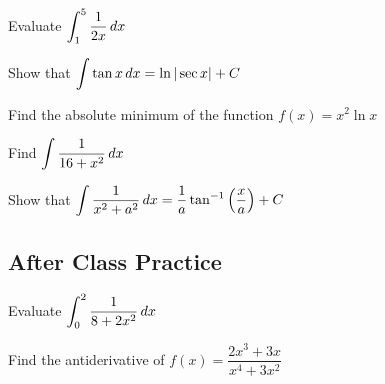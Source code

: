 \documentclass[notes]{subfiles}
\begin{document}
		\begin{ex}
			Evaluate \(\displaystyle \int_1^5 \dfrac{1}{2x}\, dx\)
		\end{ex}
			
		\begin{ex}
			Show that \(\displaystyle \int \tan x\, dx = \ln |\sec x| + C\)
		\end{ex}
			\newpage
		
		\begin{ex}
			Find the absolute minimum of the function \(f(x) = x^2\ln x\)
		\end{ex}
			
		\begin{ex}
			Find \(\displaystyle \int \dfrac{1}{16 + x^2}\, dx\)
		\end{ex}
			
		\begin{ex}
			Show that \(\displaystyle \int \dfrac{1}{x^2 + a^2}\, dx = \dfrac{1}{a}\tan^{-1}\left( \dfrac{x}{a}\right) + C\)
		\end{ex}
			\newpage
			
	\subsection*{After Class Practice}
		\begin{ex}
			Evaluate \(\displaystyle \int_0^2 \dfrac{1}{8+2x^2}\, dx\)
		\end{ex}
	
		\begin{ex}
			Find the antiderivative of \(f(x) = \dfrac{2x^3 + 3x}{x^4+3x^2}\)
		\end{ex}
	
	\clearpage			
\end{document}
